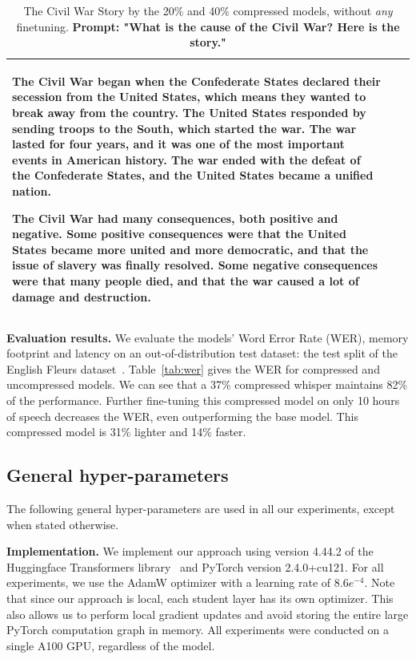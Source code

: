 \documentclass[11pt]{article}
\newcommand{\myparagraph}[1]{\noindent\textbf{#1}}
\begin{document}
\begin{table}
\begin{tabular}{ p{4.5cm}  | p{4.5cm}  | p{4.5cm} }
The Civil War began when the Confederate States declared their secession from the United States, which means they wanted to break away from the country. The United States responded by sending troops to the South, which started the war. The war lasted for four years, and it was one of the most important events in American history. The war ended with the defeat of the Confederate States, and the United States became a unified nation.

The Civil War had many consequences, both positive and negative. Some positive consequences were that the United States became more united and more democratic, and that the issue of slavery was finally resolved. Some negative consequences were that many people died, and that the war caused a lot of damage and destruction.
\\
\bottomrule
\end{tabular}
\caption{The Civil War Story by the 20\% and 40\% compressed models, without \textit{any} finetuning. {\bf{Prompt: "What is the cause of the Civil War? Here is the story."}} }
\label{tab:cw}
\end{table}

\myparagraph{Evaluation results.} We evaluate the models' Word Error Rate (WER), memory footprint and latency on an
out-of-distribution test dataset: the test split of the English Fleurs dataset~\citep{fleurs}.
Table~\ref{tab:wer} gives the WER for compressed and uncompressed models. We can see that a 37\% compressed whisper maintains 82\% of the performance. Further fine-tuning this compressed model on only 10 hours of speech decreases the WER, even outperforming the base model. This compressed model is 31\% lighter and 14\% faster.

\subsection{General hyper-parameters}
\label{sec:hypparms}

The following general hyper-parameters are used in all our experiments, except when stated otherwise.

\myparagraph{Implementation.}
We implement our approach using version 4.44.2 of the Huggingface Transformers library~\citep{wolf2020huggingfaces} and PyTorch version 2.4.0+cu121. For all experiments, we use the AdamW optimizer with a learning rate of $8.6e^{-4}$. Note that since our approach is local, each student layer has its own optimizer. This also allows us to perform local gradient updates and avoid storing the entire large PyTorch computation graph in memory. All experiments were conducted on a single A100 GPU, regardless of the model.
\end{document}
